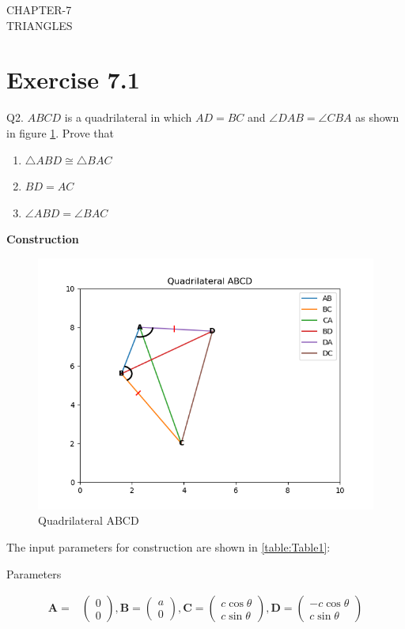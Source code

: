 \documentclass{article}
\newcommand{\myvec}[1]{\ensuremath{\begin{pmatrix}#1\end{pmatrix}}}
\let\vec\mathbf
\begin{document}
\begin{center}
        \textbf\large{CHAPTER-7 \\ TRIANGLES}
\end{center}
\section{Exercise 7.1}
Q2. $ABCD$ is a quadrilateral in which $AD = BC$ and $\angle{DAB} = \angle{CBA}$ as shown in figure \ref{figure:Fig}. Prove that
\begin{enumerate}
\item $\triangle{ABD} \cong \triangle{BAC}$
  \item $BD = AC$
  \item $\angle{ABD} = \angle{BAC}$
\end{enumerate}
\textbf{Construction}\\
\begin{figure}[h!]
	\begin{center}
		\includegraphics[width=\columnwidth]{figs/graph.png}
	\end{center}
	\caption{Quadrilateral ABCD}
	\label{figure:Fig}
\end{figure}
The input parameters for construction are shown in \ref{table:Table1}:\\
\begin{table}[h!]
    \centering
    
    \caption{Parameters}
    \label{table:Table1}
\end{table}
\pagebreak
\begin{align}
\vec{A} =& \myvec{0\\0},\vec{B} = \myvec{a\\0},\vec{C} = \myvec{c\cos\theta\\c\sin\theta},\vec{D} = \myvec{-c\cos\theta\\c\sin\theta}
\end{align}
\end{document}
